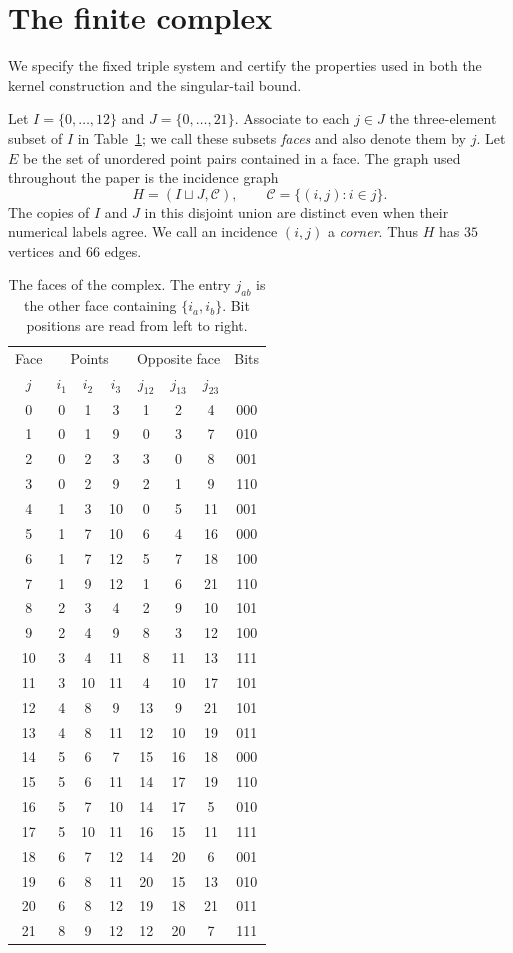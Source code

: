 \section{The finite complex}
\label{sec:complex}

We specify the fixed triple system and certify the properties used in
both the kernel construction and the singular-tail bound.

Let $I=\{0,\ldots,12\}$ and $J=\{0,\ldots,21\}$. Associate to
each $j\in J$ the three-element subset of $I$ in Table~\ref{tab:complex};
we call these subsets \emph{faces} and also denote them by $j$.
Let $E$ be the set of unordered point pairs contained in a face.
The graph used throughout the paper is the incidence graph
\[
 H=(I\sqcup J,\mathscr C),\qquad
 \mathscr C=\{(i,j):i\in j\}.
\]
The copies of $I$ and $J$ in this disjoint union are distinct even when
their numerical labels agree. We call an incidence $(i,j)$ a
\emph{corner}. Thus $H$ has $35$ vertices and $66$ edges.

\begin{table}[htbp]
\centering
\small
\setlength{\tabcolsep}{7pt}
\begin{tabular}{c@{\qquad}ccc@{\qquad}ccc@{\qquad}c}
\toprule
Face&\multicolumn{3}{c}{Points}&\multicolumn{3}{c}{Opposite face}&Bits\\
 $j$&$i_1$&$i_2$&$i_3$&$j_{12}$&$j_{13}$&$j_{23}$&\\
\midrule
0 &0&1&3   &1&2&4   &000\\
1 &0&1&9   &0&3&7   &010\\
2 &0&2&3   &3&0&8   &001\\
3 &0&2&9   &2&1&9   &110\\
4 &1&3&10  &0&5&11  &001\\
5 &1&7&10  &6&4&16  &000\\
6 &1&7&12  &5&7&18  &100\\
7 &1&9&12  &1&6&21  &110\\
8 &2&3&4   &2&9&10  &101\\
9 &2&4&9   &8&3&12  &100\\
10&3&4&11  &8&11&13 &111\\
11&3&10&11 &4&10&17 &101\\
12&4&8&9   &13&9&21 &101\\
13&4&8&11  &12&10&19&011\\
14&5&6&7   &15&16&18&000\\
15&5&6&11  &14&17&19&110\\
16&5&7&10  &14&17&5 &010\\
17&5&10&11 &16&15&11&111\\
18&6&7&12  &14&20&6 &001\\
19&6&8&11  &20&15&13&010\\
20&6&8&12  &19&18&21&011\\
21&8&9&12  &12&20&7 &111\\
\bottomrule
\end{tabular}
\caption{The faces of the complex. The entry $j_{ab}$ is the other
face containing $\{i_a,i_b\}$. Bit positions are read from left to right.}
\label{tab:complex}
\end{table}

